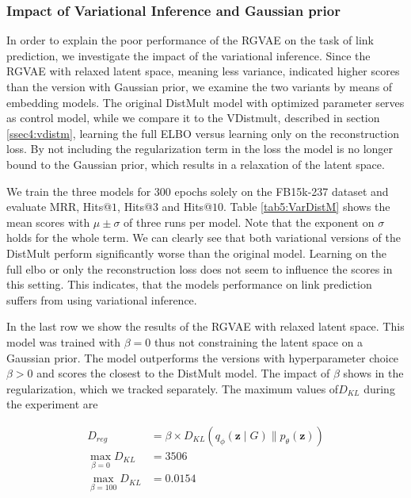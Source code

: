 \subsubsection{Impact of Variational Inference and Gaussian prior}

In order to explain the poor performance of the RGVAE on the task of link prediction, we investigate the impact of the variational inference. Since the RGVAE with relaxed latent space, meaning less variance, indicated higher scores than the version with Gaussian prior, we examine the two variants by means of embedding models. The original DistMult model with optimized parameter serves as control model, while we compare it to the VDistmult, described in section \ref{ssec4:vdistm}, learning the full ELBO versus learning only on the reconstruction loss. By not including the regularization term in the loss the model is no longer bound to the Gaussian prior, which results in a relaxation of the latent space.

We train the three models for $300$ epochs solely on the FB15k-237 dataset and evaluate MRR, Hits@$1$, Hits@$3$ and Hits@$10$. Table \ref{tab5:VarDistM} shows the mean scores with $\mu \pm \sigma$ of three runs per model. Note that the exponent on $\sigma$ holds for the whole term. We can clearly see that both variational versions of the DistMult perform significantly worse than the original model. Learning on the full elbo or only the reconstruction loss does not seem to influence the scores in this setting. This indicates, that the models performance on link prediction suffers from using variational inference.

In the last row we show the results of the RGVAE with relaxed latent space. This model was trained with $\beta=0$ thus not constraining the latent space on a Gaussian prior. The model outperforms the versions with hyperparameter choice $\beta>0$ and scores the closest to the DistMult model. The impact of $\beta$ shows in the regularization, which we tracked separately. The maximum values of$D_{K L}$ during the experiment are 

\begin{equation}
  \begin{align}
    D_{reg} &= \beta \times D_{K L}\left(q_{\phi}\left(\mathbf{z} \mid G\right) \| p_{\theta}(\mathbf{z})\right) \\
    \max_{\beta = 0} D_{K L} &= 3506 \\
    \max_{\beta = 100} D_{K L} &= 0.0154
  \end{align}
  \label{eq5:KLdifferentBeta}
\end{equation}


